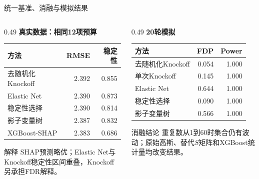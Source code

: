 \documentclass[aspectratio=169]{beamer}
\begin{document}
\begin{frame}[shrink=12]{统一基准、消融与模拟结果}
  \begin{columns}[T]
    \begin{column}{0.49\textwidth}
      \textbf{真实数据：相同12项预算}
      \begin{table}
        \scriptsize
        \begin{tabular}{lrr}
          \toprule
          方法 & RMSE & 稳定性\\
          \midrule
          去随机化Knockoff & 2.392 & 0.855\\
          Elastic Net & 2.390 & 0.873\\
          稳定性选择 & 2.390 & 0.814\\
          影子变量树 & 2.387 & 0.832\\
          XGBoost-SHAP & 2.383 & 0.686\\
          \bottomrule
        \end{tabular}
      \end{table}
      \begin{block}{解释}
        SHAP预测略优；Elastic Net与Knockoff稳定性区间重叠，Knockoff另承担FDR解释。
      \end{block}
    \end{column}
    \begin{column}{0.49\textwidth}
      \textbf{20轮模拟}
      \begin{table}
        \scriptsize
        \begin{tabular}{lrr}
          \toprule
          方法 & FDP & Power\\
          \midrule
          去随机化Knockoff & 0.054 & 1.000\\
          单次Knockoff & 0.145 & 1.000\\
          Elastic Net & 0.644 & 1.000\\
          稳定性选择 & 0.090 & 1.000\\
          影子变量树 & 0.566 & 1.000\\
          \bottomrule
        \end{tabular}
      \end{table}
      \begin{alertblock}{消融结论}
        重复数从1到60时集合仍有波动；原始高斯、替代$S$矩阵和XGBoost统计量均改变结果。
      \end{alertblock}
    \end{column}
  \end{columns}
\end{frame}
\end{document}
